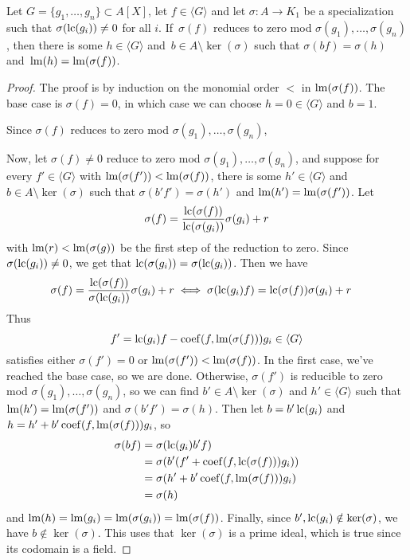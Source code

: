 \begin{lemma}\label{lem:div_to_ps_div}
  Let $G = \{g_{1}, \dots, g_{n}\} \subset A[X]$, let $f \in \langle G \rangle$ and let $\sigma : A \to K_{1}$ be a specialization such that $\sigma(\operatorname{lc}(g_{i})) \neq 0$ for all $i$. If $\,\sigma(f)$ reduces to zero mod $\sigma(g_{1}), \dots, \sigma(g_{n})$, then there is some $h \in \langle G \rangle$ and $\,b \in A \setminus \ker(\sigma)$ such that $\sigma(bf) = \sigma(h)$ and $\,\operatorname{lm}(h) = \operatorname{lm}(\sigma(f))$.
\end{lemma}
\begin{proof}
  The proof is by induction on the monomial order $<$ in $\operatorname{lm}(\sigma(f))$. The base case is $\sigma(f) = 0$, in which case we can choose $h = 0 \in \langle G \rangle$ and $b = 1$.

  Since $\sigma(f)$ reduces to zero mod $\sigma(g_{1}), \dots, \sigma(g_{n})$,

  Now, let $\sigma(f) \neq 0$ reduce to zero mod $\sigma(g_{1}), \dots, \sigma(g_{n})$, and suppose for every $f' \in \langle G \rangle$ with $\operatorname{lm}(\sigma(f')) < \operatorname{lm}(\sigma(f))$, there is some $h' \in \langle G \rangle$ and $b \in A \setminus \ker(\sigma)$ such that $\sigma(b'f') = \sigma(h')$ and $\operatorname{lm}(h') = \operatorname{lm}(\sigma(f'))$. Let
  \[\sigma(f) = \frac{\operatorname{lc}(\sigma(f))}{\operatorname{lc}(\sigma(g_{i}))} \sigma(g_{i}) + r\]
  with $\operatorname{lm}(r) < \operatorname{lm}(\sigma(g))$ be the first step of the reduction to zero. Since $\sigma(\operatorname{lc}(g_{i})) \neq 0$, we get that $\operatorname{lc}(\sigma(g_{i})) = \sigma(\operatorname{lc}(g_{i}))$. Then we have
  \begin{align*}
    \sigma(f) &= \frac{\operatorname{lc}(\sigma(f))}{\sigma(\operatorname{lc}(g_{i}))} \sigma(g_{i}) + r \iff \sigma(\operatorname{lc}(g_{i}) f) = \operatorname{lc}(\sigma(f)) \sigma(g_{i}) + r
  \end{align*}
  Thus
  \[f' = \operatorname{lc}(g_{i})f - \operatorname{coef}(f, \operatorname{lm}(\sigma(f))) g_{i} \in \langle G \rangle\]
  satisfies either $\sigma(f') = 0$ or $\operatorname{lm}(\sigma(f')) < \operatorname{lm}(\sigma(f))$. In the first case, we've reached the base case, so we are done. Otherwise, $\sigma(f')$ is reducible to zero mod $\sigma(g_{1}), \dots, \sigma(g_{n})$, so we can find $b' \in A \setminus \ker(\sigma)$ and $h' \in \langle G \rangle$ such that $\operatorname{lm}(h') = \operatorname{lm}(\sigma(f'))$ and $\sigma(b' f') = \sigma(h)$. Then let $b = b' \operatorname{lc}(g_{i})$ and $h = h' + b' \operatorname{coef}(f, \operatorname{lm}(\sigma(f))) g_{i}$, so
  \begin{align*}
    \sigma(b f) &= \sigma(\operatorname{lc}(g_{i}) b' f) \\
           &= \sigma(b' (f' + \operatorname{coef}(f, \operatorname{lc}(\sigma(f))) g_{i})) \\
           &= \sigma(h' + b' \operatorname{coef}(f, \operatorname{lm}(\sigma(f))) g_{i}) \\
           &= \sigma(h)
  \end{align*}
  and $\operatorname{lm}(h) = \operatorname{lm}(g_{i}) = \operatorname{lm}(\sigma(g_{i})) = \operatorname{lm}(\sigma(f))$. Finally, since $b', \operatorname{lc}(g_{i}) \notin \ker(\sigma)$, we have $b \notin \ker(\sigma)$. This uses that $\ker(\sigma)$ is a prime ideal, which is true since its codomain is a field.
\end{proof}















